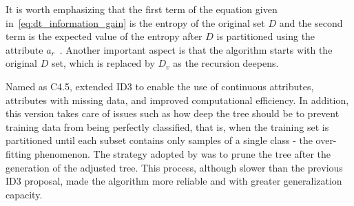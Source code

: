 It is worth emphasizing that the first term of the equation given in~\ref{eq:dt_information_gain} is the entropy of the original set $D$ and the second term is the expected value of the entropy after $D$ is partitioned using the attribute $a_r$~\citep{mitchell:97}. Another important aspect is that the algorithm starts with the original $D$ set, which is replaced by $D_v$ as the recursion deepens.

Named as C4.5, \citet{quinlan:93} extended ID3 to enable the use of continuous attributes, attributes with missing data, and improved computational efficiency. In addition, this version takes care of issues such as how deep the tree should be to prevent training data from being perfectly classified, that is, when the training set is partitioned until each subset contains only samples of a single class - the over-fitting phenomenon. The strategy adopted by \citet{quinlan:93} was to prune the tree after the generation of the adjusted tree. This process, although slower than the previous ID3 proposal, made the algorithm more reliable and with greater generalization capacity.